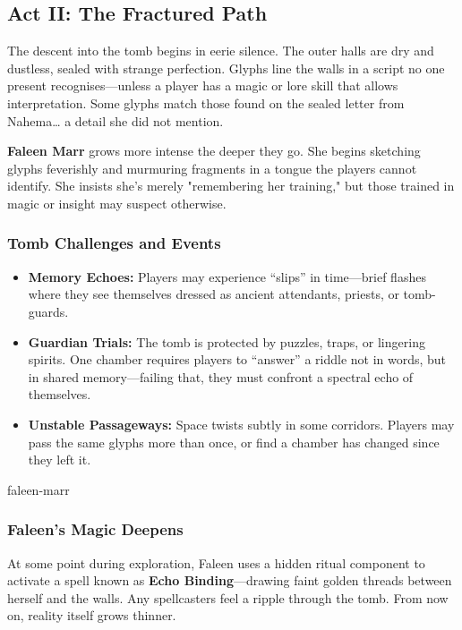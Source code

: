 \subsection{Act II: The Fractured Path}

The descent into the tomb begins in eerie silence. The outer halls are dry and dustless, sealed with strange perfection. Glyphs line the walls in a script no one present recognises—unless a player has a magic or lore skill that allows interpretation. Some glyphs match those found on the sealed letter from Nahema… a detail she did not mention.

\textbf{Faleen Marr} grows more intense the deeper they go. She begins sketching glyphs feverishly and murmuring fragments in a tongue the players cannot identify. She insists she’s merely "remembering her training," but those trained in magic or insight may suspect otherwise.

\vspace{0.5\baselineskip}
\subsubsection{Tomb Challenges and Events}
\begin{itemize}
    \item \textbf{Memory Echoes:} Players may experience “slips” in time—brief flashes where they see themselves dressed as ancient attendants, priests, or tomb-guards.
    
    \item \textbf{Guardian Trials:} The tomb is protected by puzzles, traps, or lingering spirits. One chamber requires players to “answer” a riddle not in words, but in shared memory—failing that, they must confront a spectral echo of themselves.

    \item \textbf{Unstable Passageways:} Space twists subtly in some corridors. Players may pass the same glyphs more than once, or find a chamber has changed since they left it.
\end{itemize}

\newcolumn
{faleen-marr}
\newcolumn



\subsubsection{Faleen’s Magic Deepens}

At some point during exploration, Faleen uses a hidden ritual component to activate a spell known as \textbf{Echo Binding}—drawing faint golden threads between herself and the walls. Any spellcasters feel a ripple through the tomb. From now on, reality itself grows thinner.

